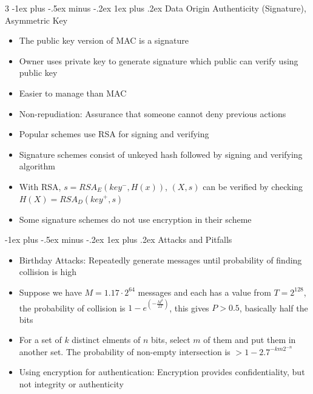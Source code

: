 \documentclass[10pt, landscape]{article}
\makeatletter
\renewcommand{\subsection}{\@startsection{subsection}{3}{0mm}%
                                {-1ex plus -.5ex minus -.2ex}%
                                {1ex plus .2ex}%
                                {\normalfont\small\bfseries}}%
\makeatother
\begin{document}
\begin{multicols*}{3}
\subsection{Data Origin Authenticity (Signature), Asymmetric Key}
\begin{itemize}
    \item The public key version of MAC is a signature
    \item Owner uses private key to generate signature which public can verify using public key
    \item Easier to manage than MAC
    \item Non-repudiation: Assurance that someone cannot deny previous actions
    \item Popular schemes use RSA for signing and verifying
    \item Signature schemes consist of unkeyed hash followed by signing and verifying algorithm
    \item With RSA, $s=RSA_E(key^-, H(x))$, $(X,s)$ can be verified by checking $H(X)=RSA_D(key^+, s)$
    \item Some signature schemes do not use encryption in their scheme
\end{itemize}

\subsection{Attacks and Pitfalls}
\begin{itemize}
    \item Birthday Attacks: Repeatedly generate messages until probability of finding collision is high
    \item Suppose we have $M=1.17\cdot2^{64}$ messages and each has a value from $T=2^{128}$, the probability of collision is $1-e^{(-\frac{M^2}{2T})}$, this gives $P>0.5$, basically half the bits
    \item For a set of $k$ distinct elments of $n$ bits, select $m$ of them and put them in another set. The probability of non-empty intersection is $>1-2.7^{-km2^{-n}}$
    \item Using encryption for authentication: Encryption provides confidentiality, but not integrity or authenticity
\end{itemize}

\end{multicols*}
\end{document}
